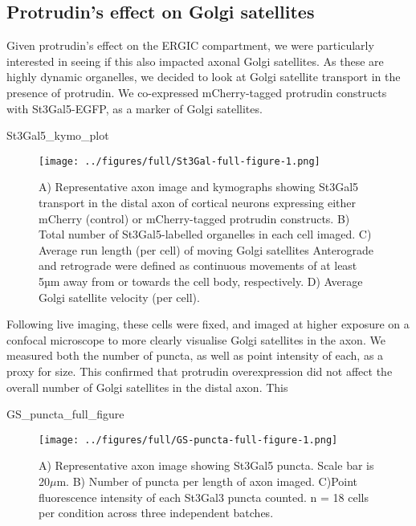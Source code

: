 \documentclass[
  12pt,
  a4paper,
]{book}
\newenvironment{Shaded}{\begin{snugshade}}{\end{snugshade}}
\newcommand{\NormalTok}[1]{#1}
\begin{document}
\hypertarget{protrudins-effect-on-golgi-satellites}{%
\subsection{Protrudin's effect on Golgi satellites}\label{protrudins-effect-on-golgi-satellites}}

Given protrudin's effect on the ERGIC compartment, we were particularly interested in seeing if this also impacted axonal Golgi satellites. As these are highly dynamic organelles, we decided to look at Golgi satellite transport in the presence of protrudin. We co-expressed mCherry-tagged protrudin constructs with St3Gal5-EGFP, as a marker of Golgi satellites.

\begin{Shaded}
\begin{Highlighting}[]
\NormalTok{St3Gal5\_kymo\_plot}
\end{Highlighting}
\end{Shaded}

\begin{figure}
\centering
\texttt{[image: ../figures/full/St3Gal-full-figure-1.png]}
\caption{\label{fig:St3Gal-full-figure}A) Representative axon image and kymographs showing St3Gal5 transport in the distal axon of cortical neurons expressing either mCherry (control) or mCherry-tagged protrudin constructs. B) Total number of St3Gal5-labelled organelles in each cell imaged. C) Average run length (per cell) of moving Golgi satellites Anterograde and retrograde were defined as continuous movements of at least 5µm away from or towards the cell body, respectively. D) Average Golgi satellite velocity (per cell).}
\end{figure}

Following live imaging, these cells were fixed, and imaged at higher exposure on a confocal microscope to more clearly visualise Golgi satellites in the axon. We measured both the number of puncta, as well as point intensity of each, as a proxy for size. This confirmed that protrudin overexpression did not affect the overall number of Golgi satellites in the distal axon. This

\begin{Shaded}
\begin{Highlighting}[]
\NormalTok{GS\_puncta\_full\_figure}
\end{Highlighting}
\end{Shaded}

\begin{figure}
\centering
\texttt{[image: ../figures/full/GS-puncta-full-figure-1.png]}
\caption{\label{fig:GS-puncta-full-figure}A) Representative axon image showing St3Gal5 puncta. Scale bar is 20\(\mu\)m. B) Number of puncta per length of axon imaged. C)Point fluorescence intensity of each St3Gal3 puncta counted. n = 18 cells per condition across three independent batches.}
\end{figure}
\end{document}
